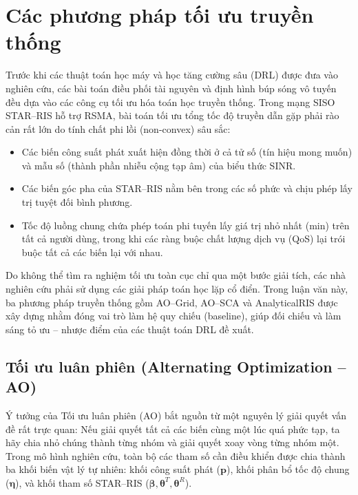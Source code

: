 \section{Các phương pháp tối ưu truyền thống}
\label{sec:toi-uu-truyen-thong}

Trước khi các thuật toán học máy và học tăng cường sâu (DRL) được đưa vào nghiên cứu, các bài toán điều
phối tài nguyên và định hình búp sóng vô tuyến đều dựa vào các công cụ tối ưu hóa toán học truyền thống.
Trong mạng SISO STAR--RIS hỗ trợ RSMA, bài toán tối ưu tổng tốc độ truyền dẫn gặp phải rào cản rất lớn do
tính chất phi lồi (non-convex) sâu sắc:
\begin{itemize}
\item Các biến công suất phát xuất hiện đồng thời ở cả tử số (tín hiệu mong muốn) và mẫu số (thành phần
  nhiễu cộng tạp âm) của biểu thức SINR.
\item Các biến góc pha của STAR--RIS nằm bên trong các số phức và chịu phép lấy trị tuyệt đối bình phương.
\item Tốc độ luồng chung chứa phép toán phi tuyến lấy giá trị nhỏ nhất (min) trên tất cả người dùng, trong
  khi các ràng buộc chất lượng dịch vụ (QoS) lại trói buộc tất cả các biến lại với nhau.
\end{itemize}
Do không thể tìm ra nghiệm tối ưu toàn cục chỉ qua một bước giải tích, các nhà nghiên cứu phải sử dụng các
giải pháp toán học lặp cổ điển. Trong luận văn này, ba phương pháp truyền thống gồm AO--Grid, AO--SCA và
AnalyticalRIS được xây dựng nhằm đóng vai trò làm hệ quy chiếu (baseline), giúp đối chiếu và làm sáng tỏ
ưu -- nhược điểm của các thuật toán DRL đề xuất.

\subsection{Tối ưu luân phiên (Alternating Optimization -- AO)}
\label{ssec:ao}


Ý tưởng của Tối ưu luân phiên (AO) bắt nguồn từ một nguyên lý giải quyết vấn đề rất trực quan: Nếu giải
quyết tất cả các biến cùng một lúc quá phức tạp, ta hãy chia nhỏ chúng thành từng nhóm và giải quyết xoay
vòng từng nhóm một. Trong mô hình nghiên cứu, toàn bộ các tham số cần điều khiển được chia thành ba khối
biến vật lý tự nhiên: khối công suất phát ($\mathbf{p}$), khối phân bổ tốc độ chung
($\boldsymbol{\eta}$), và khối tham số STAR--RIS ($\boldsymbol{\beta}, \boldsymbol{\theta}^T,
\boldsymbol{\theta}^R$).

